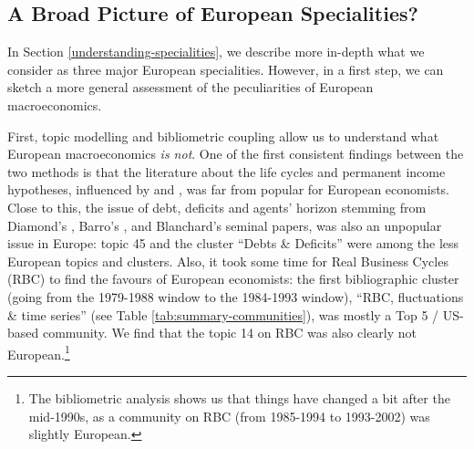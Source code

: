\documentclass[]{elsarticle} %
\begin{document}
\hypertarget{a-broad-picture-of-european-specialities}{%
\subsection{A Broad Picture of European
Specialities?}\label{a-broad-picture-of-european-specialities}}

In Section \ref{understanding-specialities}, we describe more in-depth
what we consider as three major European specialities. However, in a
first step, we can sketch a more general assessment of the peculiarities
of European macroeconomics.

First, topic modelling and bibliometric coupling allow us to understand
what European macroeconomics \emph{is not}. One of the first consistent
findings between the two methods is that the literature about the life
cycles and permanent income hypotheses, influenced by
\citet{friedman1957} and \citet{hall1978b}, was far from popular for
European economists. Close to this, the issue of debt, deficits and
agents' horizon stemming from Diamond's \citeyearpar{diamond1965},
Barro's \citeyearpar{barro1974}, and Blanchard's
\citeyearpar{blanchard1985} seminal papers, was also an unpopular issue
in Europe: topic 45 and the cluster ``Debts \& Deficits'' were among the
less European topics and clusters. Also, it took some time for Real
Business Cycles (RBC) to find the favours of European economists: the
first bibliographic cluster (going from the 1979-1988 window to the
1984-1993 window), ``RBC, fluctuations \& time series'' (see Table
\ref{tab:summary-communities}), was mostly a Top 5 / US-based community.
We find that the topic 14 on RBC was also clearly not
European.\footnote{The bibliometric analysis shows us that things have
  changed a bit after the mid-1990s, as a community on RBC (from
  1985-1994 to 1993-2002) was slightly European.}
\end{document}

